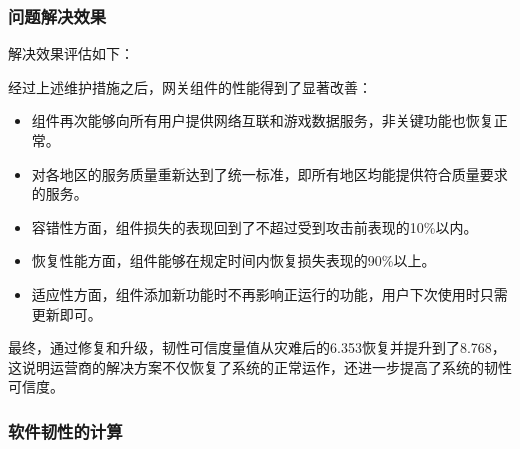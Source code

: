 \documentclass{article}
\begin{document}
\subsubsection{问题解决效果}

解决效果评估如下：

经过上述维护措施之后，网关组件的性能得到了显著改善：

\begin{itemize}
	\item 组件再次能够向所有用户提供网络互联和游戏数据服务，非关键功能也恢复正常。
	\item 对各地区的服务质量重新达到了统一标准，即所有地区均能提供符合质量要求的服务。
	\item 容错性方面，组件损失的表现回到了不超过受到攻击前表现的10\%以内。
	\item 恢复性能方面，组件能够在规定时间内恢复损失表现的90\%以上。
	\item 适应性方面，组件添加新功能时不再影响正运行的功能，用户下次使用时只需更新即可。
\end{itemize}

最终，通过修复和升级，韧性可信度量值从灾难后的6.353恢复并提升到了8.768，这说明运营商的解决方案不仅恢复了系统的正常运作，还进一步提高了系统的韧性可信度。

\subsubsection{软件韧性的计算}
\end{document}
